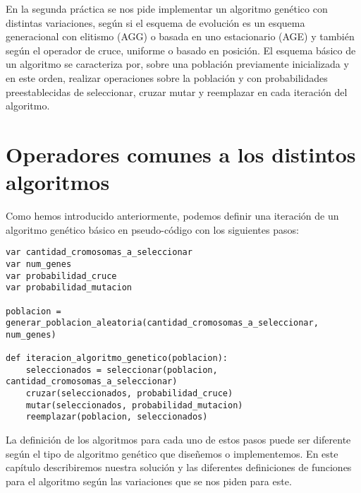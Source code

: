 En la segunda práctica se nos pide implementar un algoritmo genético con distintas variaciones,
según si el esquema de evolución es un esquema generacional con elitismo (AGG) o basada en
uno estacionario (AGE) y también según el operador de cruce, uniforme o basado en posición.
El esquema básico de un algoritmo se caracteriza por, sobre una población previamente inicializada
y en este orden, realizar operaciones sobre la población y con probabilidades preestablecidas
de seleccionar, cruzar mutar y reemplazar en cada iteración del algoritmo.

\section{Operadores comunes a los distintos algoritmos}

Como hemos introducido anteriormente, podemos definir una iteración de un algoritmo genético básico en pseudo-código
con los siguientes pasos:

\begin{minipage}{\textwidth}
\begin{lstlisting}[mathescape=true,caption={Esquema general de un algoritmo genético.},captionpos=b]
var cantidad_cromosomas_a_seleccionar
var num_genes
var probabilidad_cruce
var probabilidad_mutacion

poblacion = generar_poblacion_aleatoria(cantidad_cromosomas_a_seleccionar, num_genes)

def iteracion_algoritmo_genetico(poblacion):
	seleccionados = seleccionar(poblacion, cantidad_cromosomas_a_seleccionar)
	cruzar(seleccionados, probabilidad_cruce)
	mutar(seleccionados, probabilidad_mutacion)
	reemplazar(poblacion, seleccionados)
\end{lstlisting}
\end{minipage}

La definición de los algoritmos para cada uno de estos pasos puede ser diferente según el tipo de
algoritmo genético que diseñemos o implementemos. En este capítulo describiremos nuestra solución
y las diferentes definiciones de funciones para el algoritmo según las variaciones que se nos piden
para este.

